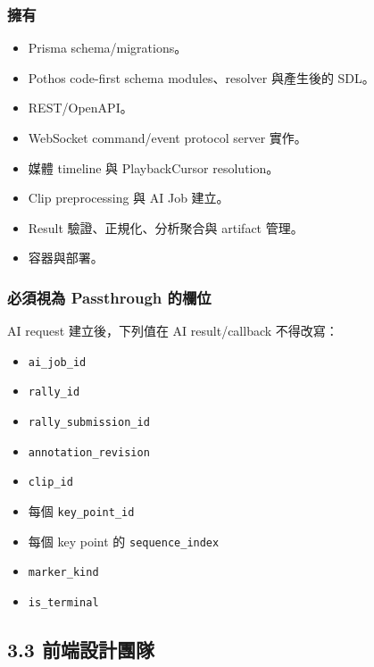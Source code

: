 \documentclass[
  9pt,
  a4paper,
]{article}
\providecommand{\tightlist}{%
  \setlength{\itemsep}{0pt}\setlength{\parskip}{0pt}}
\begin{document}
\subsubsection{擁有}\label{ux64c1ux6709}

\begin{itemize}
\tightlist
\item
  Prisma schema/migrations。
\item
  Pothos code-first schema modules、resolver 與產生後的 SDL。
\item
  REST/OpenAPI。
\item
  WebSocket command/event protocol server 實作。
\item
  媒體 timeline 與 PlaybackCursor resolution。
\item
  Clip preprocessing 與 AI Job 建立。
\item
  Result 驗證、正規化、分析聚合與 artifact 管理。
\item
  容器與部署。
\end{itemize}

\subsubsection{必須視為 Passthrough
的欄位}\label{ux5fc5ux9808ux8996ux70ba-passthrough-ux7684ux6b04ux4f4d}

AI request 建立後，下列值在 AI result/callback 不得改寫：

\begin{itemize}
\tightlist
\item
  \texttt{ai\_\allowbreak{}job\_\allowbreak{}id}
\item
  \texttt{rally\_\allowbreak{}id}
\item
  \texttt{rally\_\allowbreak{}submission\_\allowbreak{}id}
\item
  \texttt{annotation\_\allowbreak{}revision}
\item
  \texttt{clip\_\allowbreak{}id}
\item
  每個 \texttt{key\_\allowbreak{}point\_\allowbreak{}id}
\item
  每個 key point 的 \texttt{sequence\_\allowbreak{}index}
\item
  \texttt{marker\_\allowbreak{}kind}
\item
  \texttt{is\_\allowbreak{}terminal}
\end{itemize}

\subsection{3.3
前端設計團隊}\label{33-ux524dux7aefux8a2dux8a08ux5718ux968a}
\end{document}
